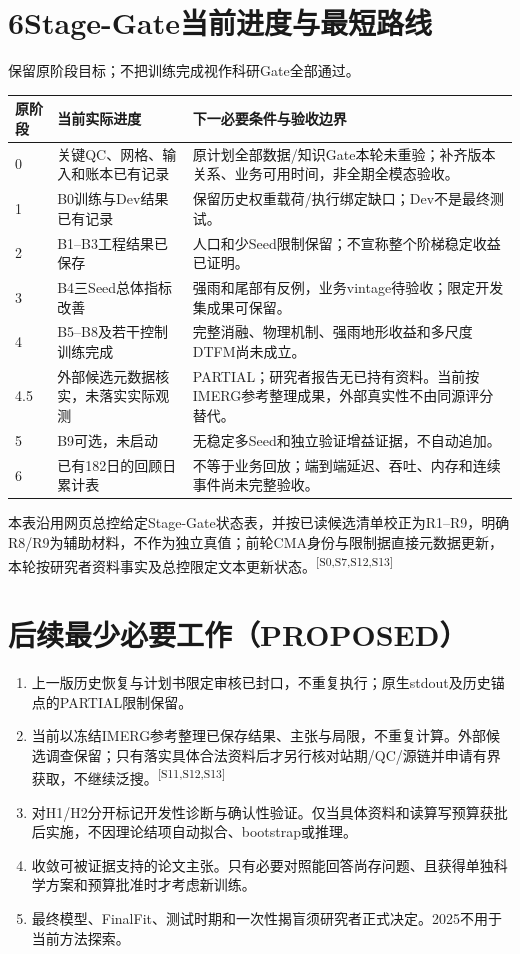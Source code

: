 \documentclass[UTF8,10.5pt,a4paper,fontset=none]{ctexart}
\newcommand{\evi}[1]{\textsuperscript{\color{muted}[#1]}}
\newcommand{\pageheading}[2]{\clearpage\section*{#1}\textcolor{muted}{#2}\par\vspace{3pt}}
\begin{document}
\pageheading{6\quad Stage-Gate当前进度与最短路线}{保留原阶段目标；不把训练完成视作科研Gate全部通过。}
\begin{tabularx}{\textwidth}{@{}p{1.2cm}>{\raggedright\arraybackslash}p{5.3cm}>{\raggedright\arraybackslash}X@{}}
\toprule 原阶段 & 当前实际进度 & 下一必要条件与验收边界\\\midrule
0 & 关键QC、网格、输入和账本已有记录 & 原计划全部数据/知识Gate本轮未重验；补齐版本关系、业务可用时间，非全期全模态验收。\\
1 & B0训练与Dev结果已有记录 & 保留历史权重载荷/执行绑定缺口；Dev不是最终测试。\\
2 & B1--B3工程结果已保存 & 人口和少Seed限制保留；不宣称整个阶梯稳定收益已证明。\\
3 & B4三Seed总体指标改善 & 强雨和尾部有反例，业务vintage待验收；限定开发集成果可保留。\\
4 & B5--B8及若干控制训练完成 & 完整消融、物理机制、强雨地形收益和多尺度DTFM尚未成立。\\
4.5 & 外部候选元数据核实，未落实实际观测 & PARTIAL；研究者报告无已持有资料。当前按IMERG参考整理成果，外部真实性不由同源评分替代。\\
5 & B9可选，未启动 & 无稳定多Seed和独立验证增益证据，不自动追加。\\
6 & 已有182日的回顾日累计表 & 不等于业务回放；端到端延迟、吞吐、内存和连续事件尚未完整验收。\\
\bottomrule
\end{tabularx}
\par
本表沿用网页总控给定Stage-Gate状态表，并按已读候选清单校正为R1--R9，明确R8/R9为辅助材料，不作为独立真值；前轮CMA身份与限制据直接元数据更新，本轮按研究者资料事实及总控限定文本更新状态。\evi{S0,S7,S12,S13}
\section*{后续最少必要工作（PROPOSED）}
\begin{enumerate}[leftmargin=2em,itemsep=4pt]
\item 上一版历史恢复与计划书限定审核已封口，不重复执行；原生stdout及历史锚点的PARTIAL限制保留。
\item 当前以冻结IMERG参考整理已保存结果、主张与局限，不重复计算。外部候选调查保留；只有落实具体合法资料后才另行核对站期/QC/源链并申请有界获取，不继续泛搜。\evi{S11,S12,S13}
\item 对H1/H2分开标记开发性诊断与确认性验证。仅当具体资料和读算写预算获批后实施，不因理论结项自动拟合、bootstrap或推理。
\item 收敛可被证据支持的论文主张。只有必要对照能回答尚存问题、且获得单独科学方案和预算批准时才考虑新训练。
\item 最终模型、FinalFit、测试时期和一次性揭盲须研究者正式决定。2025不用于当前方法探索。
\end{enumerate}
\end{document}
